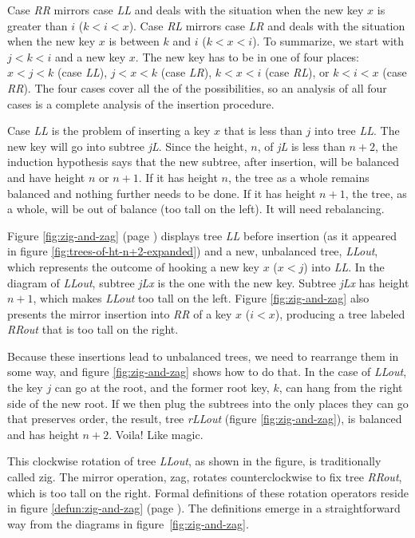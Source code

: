 Case \emph{RR} mirrors
case \emph{LL} and deals with the situation when the new key $x$
is greater than $i$ ($k < i < x$).
Case \emph{RL} mirrors case \emph{LR} and
deals with the situation when the new key $x$
is between $k$ and $i$ ($k < x < i$).
To summarize, we start with $j < k < i$ and
a new key $x$. The new key has to be in one of
four places:
$x < j < k$ (case \emph{LL}),
$j < x < k$ (case \emph{LR}),
$k < x < i$ (case \emph{RL}), or
$k < i < x$ (case \emph{RR}).
The four cases cover all the of the possibilities, so
an analysis of all four cases is a complete analysis
of the insertion procedure.

Case \emph{LL} is the problem of inserting
a key $x$ that is less than $j$
into tree \emph{LL}.
The new key will go into subtree \emph{jL}.
Since the height, $n$, of \emph{jL} is less than $n+2$,
the induction hypothesis says that the new subtree,
after insertion,
will be balanced and have height $n$ or $n+1$.
If it has height $n$, the tree as a whole remains
balanced and nothing further needs to be done.
If it has height $n+1$, the tree, as a whole,
will be out of balance (too tall on the left).
It will need rebalancing.

Figure \ref{fig:zig-and-zag} (page \pageref{fig:zig-and-zag})
displays tree \emph{LL} before insertion
(as it appeared in figure \ref{fig:trees-of-ht-n+2-expanded})
and a new, unbalanced tree, \emph{LLout}, which represents
the outcome of hooking a new key $x$ ($x < j$) into \emph{LL}.
In the diagram of \emph{LLout}, subtree
\emph{jLx} is the one with the new key.
Subtree \emph{jLx} has height $n+1$,
which makes \emph{LLout} too tall on the left.
Figure \ref{fig:zig-and-zag} also presents the mirror insertion
into \emph{RR} of a key
$x$ ($i < x$),
producing a tree labeled \emph{RRout}
that is too tall on the right.

Because these insertions lead to unbalanced trees,
we need to rearrange them in some way,
and figure \ref{fig:zig-and-zag} shows how to do that.
In the case of \emph{LLout},
the key $j$ can go at the root, and the former root key, $k$,
can hang from the right side of the new root.
If we then plug the subtrees into the only places they
can go that preserves order,
the result, tree \emph{rLLout} (figure \ref{fig:zig-and-zag}),
is balanced and has height $n+2$.
Voila! Like magic.

This clockwise rotation of tree \emph{LLout},
as shown in the figure,
is traditionally called \textsf{zig}.
The mirror operation, \textsf{zag}, rotates counterclockwise to fix
tree \emph{RRout}, which is too tall on the right.
Formal definitions of these rotation operators reside in
figure \ref{defun:zig-and-zag} (page \pageref{defun:zig-and-zag}).
The definitions emerge in a straightforward way from
the diagrams in figure~\ref{fig:zig-and-zag}.

